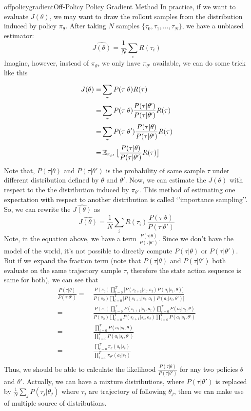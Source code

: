 \documentclass[9pt]{article}
\begin{document}
\begin{topic}{offpolicygradient}{Off-Policy Policy Gradient Method}
In practice, if we want to evaluate $J(\theta)$, we may want to draw the rollout samples from the distribution induced by policy $\pi_{\theta}$. After taking $N$ samples $\{\tau_0,\tau_1,\ldots,\tau_N\}$, we have a unbiased estimator:
\[
	\hat{J(\theta)} = \frac{1}{N}\sum_{i}R(\tau_i)
\]
Imagine, however, instead of $\pi_{\theta}$, we only have $\pi_{\theta'}$ available, we can do some trick like this
\begin{comment}
need to figure why can we ignore the dynamic model
\end{comment}
\[
\begin{split}
J(\theta) = & \sum_{\tau}P(\tau|\theta)R(\tau)\\
= & \sum_{\tau}P(\tau|\theta) \frac{P(\tau|\theta')}{P(\tau|\theta')} R(\tau)\\
= & \sum_{\tau}P(\tau|\theta') \frac{P(\tau|\theta)}{P(\tau|\theta')} R(\tau)\\
= & \operatorname{\mathbb{E}}_{\pi_{\theta'}}\big[\frac{P(\tau|\theta)}{P(\tau|\theta')} R(\tau)\big]
\end{split}
\]
Note that, $P(\tau|\theta)$ and $P(\tau|\theta')$ is the probability of same sample $\tau$ under different distribution defined by $\theta$ and $\theta'$. Now, we can estimate the $J(\theta)$ with respect to the the distribution induced by $\pi_{\theta'}$. This method of estimating one expectation with respect to another distribution is called `'importance sampling''. So, we can rewrite the $\hat{J(\theta)}$ as
\[
\hat{J(\theta)} = \frac{1}{N}\sum_{i}R(\tau_i)\frac{P(\tau|\theta)}{P(\tau|\theta')}
\]
Note, in the equation above, we have a term $\frac{P(\tau|\theta)}{P(\tau|\theta')}$. Since we don't have the model of the world, it's not possible to directly compute $P(\tau|\theta)$ or $P(\tau|\theta')$. But if we expand the fraction term (note that $P(\tau|\theta)$ and $P(\tau|\theta')$ both evaluate on the same trajectory sample $\tau$, therefore the state action sequence is same for both), we can see that 
\[
\begin{split}
\frac{P(\tau|\theta)}{P(\tau|\theta')} = &\ \frac{P(s_0)\prod_{t=0}^T\big[P(s_{t+1}|s_t,a_t)P(a_t|s_t, \theta)\big]}{P(s_0)\prod_{t=0}^T\big[P(s_{t+1}|s_t,a_t)P(a_t|s_t,\theta')\big]}\\
= &\ \frac{P(s_0)\prod_{t=0}^TP(s_{t+1}|s_t,a_t)\prod_{t=0}^TP(a_t|s_t, \theta)}{P(s_0)\prod_{t=0}^TP(s_{t+1}|s_t,a_t)\prod_{t=0}^TP(a_t|s_t,\theta')}\\
= &\ \frac{\prod_{t=0}^TP(a_t|s_t,\theta)}{\prod_{t=0}^TP(a_t|s_t,\theta')}\\
= &\ \frac{\prod_{t=0}^T\pi_{\theta}(a_t|s_t)}{\prod_{t=0}^T\pi_{\theta'}(a_t|s_t)}\\
\end{split}
\]
Thus, we should be able to calculate the likelihood $\frac{P(\tau|\theta)}{P(\tau|\theta')}$ for any two policies $\theta$
 and $\theta'$. Actually, we can have a mixture distributions, where $P(\tau|\theta')$ is replaced by $\frac{1}{N}\sum_jP(\tau_j|\theta_j)$ where $\tau_j$ are trajectory of following $\theta_j$, then we can make use of multiple source of distributions.
\end{topic}
\end{document}
